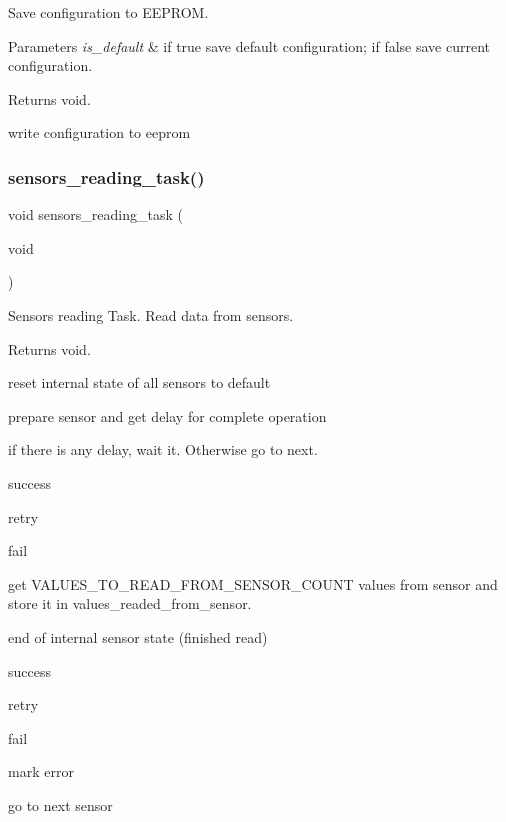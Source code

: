 Save configuration to E\+E\+P\+R\+OM. 


\begin{DoxyParams}{Parameters}
{\em is\+\_\+default} & if true save default configuration; if false save current configuration. \\
\hline
\end{DoxyParams}
\begin{DoxyReturn}{Returns}
void. 
\end{DoxyReturn}
write configuration to eeprom \mbox{\label{rmap_8ino_ad3efe51e17cb8205a24267c2992a12d4}} 
\subsubsection{\texorpdfstring{sensors\+\_\+reading\+\_\+task()}{sensors\_reading\_task()}}
{\footnotesize\ttfamily void sensors\+\_\+reading\+\_\+task (\begin{DoxyParamCaption}\item[{void}]{ }\end{DoxyParamCaption})}



Sensors reading Task. Read data from sensors. 

\begin{DoxyReturn}{Returns}
void. 
\end{DoxyReturn}
reset internal state of all sensors to default

prepare sensor and get delay for complete operation

if there is any delay, wait it. Otherwise go to next.

success

retry

fail

get V\+A\+L\+U\+E\+S\+\_\+\+T\+O\+\_\+\+R\+E\+A\+D\+\_\+\+F\+R\+O\+M\+\_\+\+S\+E\+N\+S\+O\+R\+\_\+\+C\+O\+U\+NT values from sensor and store it in values\+\_\+readed\+\_\+from\+\_\+sensor.

end of internal sensor state (finished read)

success

retry

fail

mark error

go to next sensor

